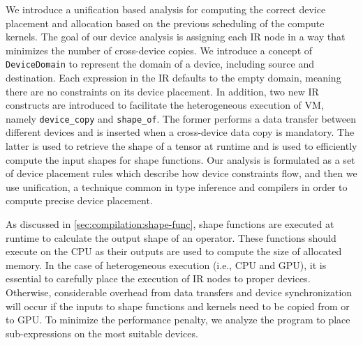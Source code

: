 We introduce a unification based analysis for computing the correct device placement and
  allocation based on the previous scheduling of the compute kernels.
The goal of our device analysis is assigning each IR node in a way that minimizes
  the number of cross-device copies. We introduce a concept of \texttt{DeviceDomain}
  to represent the domain of a device, including source and destination.
Each expression in the IR defaults to the empty domain, meaning there
  are no constraints on its device placement.
In addition, two new IR constructs are introduced to facilitate the heterogeneous execution of VM,
  namely \verb|device_copy| and \verb|shape_of|.
The former performs a data transfer between different devices and is
  inserted when a cross-device data copy is mandatory.
The latter is used to retrieve the shape of a tensor at runtime and is
  used to efficiently compute the input shapes for shape functions.
Our analysis is formulated as a set of device placement rules which describe how device constraints
  flow, and then we use unification, a technique common in type inference and compilers
  in order to compute precise device placement.

As discussed in \autoref{sec:compilation:shape-func},
  shape functions are executed at runtime to calculate the output shape of an operator.
These functions should execute on the CPU as their outputs are used to compute the size of allocated memory.
In the case of heterogeneous execution (i.e., CPU and GPU),
  it is essential to carefully place the execution of IR nodes to proper devices.
Otherwise, considerable overhead from data transfers and device synchronization will
  occur if the inputs to shape functions and kernels need to be copied from or to GPU.
To minimize the performance penalty, we analyze the program to place sub-expressions on the most suitable devices.

